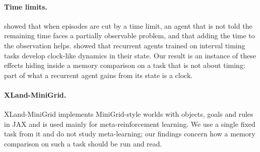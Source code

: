 \paragraph{Time limits.}
\citet{pardo2018timelimits} showed that when episodes are cut by a time limit, an agent that is
not told the remaining time faces a partially observable problem, and that adding the time to the
observation helps. \citet{deverett2019interval} showed that recurrent agents trained on interval
timing tasks develop clock-like dynamics in their state. Our result is an instance of these
effects hiding inside a memory comparison on a task that is not about timing: part of what a
recurrent agent gains from its state is a clock.

\paragraph{XLand-MiniGrid.}
XLand-MiniGrid \citep{nikulin2024xland} implements MiniGrid-style worlds
\citep{chevalierboisvert2023minigrid} with objects, goals and rules in JAX and is used mainly for
meta-reinforcement learning. We use a single fixed task from it and do not study meta-learning;
our findings concern how a memory comparison on such a task should be run and read.
